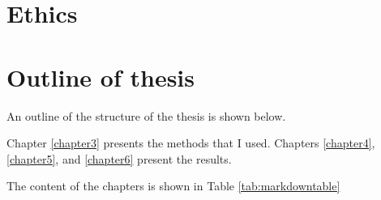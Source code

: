 \documentclass[12pt,]{book}
\begin{document}
\hypertarget{ethics}{%
\section{Ethics}\label{ethics}}

\blindtext

\hypertarget{outline-of-thesis}{%
\section{Outline of thesis}\label{outline-of-thesis}}

An outline of the structure of the thesis is shown below.

Chapter \ref{chapter3} presents the methods that I used.
Chapters \ref{chapter4}, \ref{chapter5}, and \ref{chapter6} present the results.

The content of the chapters is shown in Table \ref{tab:markdowntable}
\end{document}
